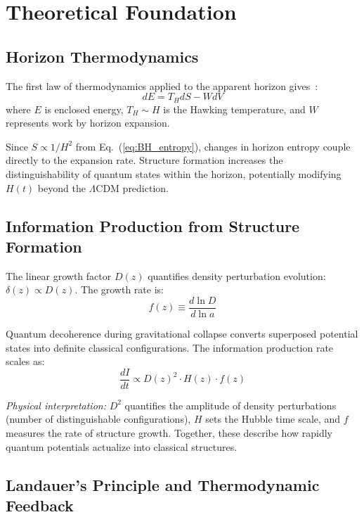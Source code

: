 \documentclass[twocolumn,superscriptaddress,prl,amsmath,amssymb]{revtex4-2}
\begin{document}
\section{Theoretical Foundation}

\subsection{Horizon Thermodynamics}

The first law of thermodynamics applied to the apparent horizon gives~\cite{Cai2005}:
\begin{equation}
dE = T_H dS - W dV
\end{equation}
where $E$ is enclosed energy, $T_H \sim H$ is the Hawking temperature, and $W$ represents work by horizon expansion.

Since $S \propto 1/H^2$ from Eq.~(\ref{eq:BH_entropy}), changes in horizon entropy couple directly to the expansion rate. Structure formation increases the distinguishability of quantum states within the horizon, potentially modifying $H(t)$ beyond the $\Lambda$CDM prediction.

\subsection{Information Production from Structure Formation}

The linear growth factor $D(z)$ quantifies density perturbation evolution: $\delta(z) \propto D(z)$. The growth rate is:
\begin{equation}
f(z) \equiv \frac{d\ln D}{d\ln a}
\end{equation}

Quantum decoherence during gravitational collapse converts superposed potential states into definite classical configurations. The information production rate scales as:
\begin{equation}
\frac{dI}{dt} \propto D(z)^2 \cdot H(z) \cdot f(z)
\end{equation}

\textit{Physical interpretation:} $D^2$ quantifies the amplitude of density perturbations (number of distinguishable configurations), $H$ sets the Hubble time scale, and $f$ measures the rate of structure growth. Together, these describe how rapidly quantum potentials actualize into classical structures.

\subsection{Landauer's Principle and Thermodynamic Feedback}
\end{document}
